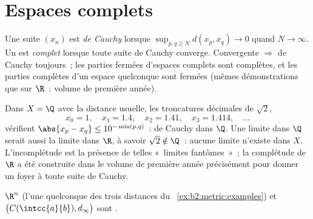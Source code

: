 \section{Espaces complets}

\begin{definition}\label{def:b2:metric:complete}
Une suite $(x_n)$ est \emph{de Cauchy} lorsque $\sup_{p, q \geq N}
d(x_p, x_q) \to 0$ quand $N \to \infty$. Un  est
\emph{complet} lorsque toute suite de
Cauchy converge. Convergente $\Rightarrow$ de Cauchy toujours~; les
parties fermées d'espaces complets sont complètes, et les parties
complètes d'un espace quelconque sont fermées (mêmes démonstrations
que sur $\R$~: volume de première année).
\end{definition}

\begin{example}\label{ex:b2:metric:cauchynolimit}
Dans $X = \Q$ avec la distance usuelle, les troncatures décimales de
$\sqrt2$,
\[
x_0 = 1,\quad x_1 = 1.4,\quad x_2 = 1.41,\quad x_3 = 1.414,
\quad\dots
\]
vérifient $\abs{x_p - x_q} \leq 10^{-\min(p,q)}$~: de Cauchy dans
$\Q$. Une limite dans $\Q$ serait aussi la limite dans $\R$, à
savoir $\sqrt2 \notin \Q$~: aucune limite n'existe dans $X$.
L'incomplétude est la présence de telles «~limites fantômes~»~; la
complétude de $\R$ a été construite dans le volume de première année
précisément pour donner un foyer à toute suite de Cauchy.
\end{example}

\begin{theorem}\label{thm:b2:metric:rncomplete}
$\R^n$ (l'une quelconque des trois distances du~%
\cref{ex:b2:metric:examples}) et $\bigl(C(\intcc{a}{b}),
d_\infty\bigr)$ sont .
\end{theorem}


